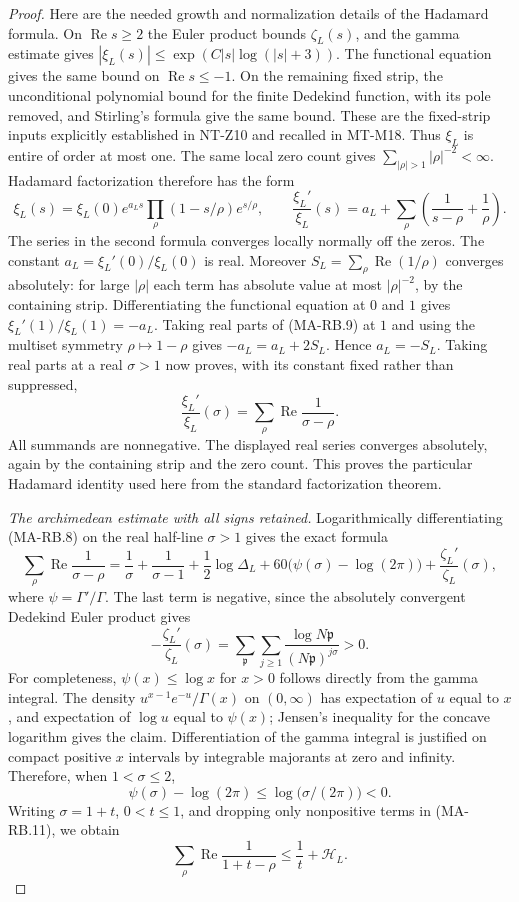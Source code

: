 \begin{proof}
Here are the needed growth and normalization details of the
Hadamard formula.  On $\operatorname{Re}s\ge2$ the Euler product
bounds $\zeta_L(s)$, and the gamma estimate gives
$|\xi_L(s)|\le\exp(C|s|\log(|s|+3))$.
The functional equation gives the same bound on
$\operatorname{Re}s\le-1$.
On the remaining fixed strip, the unconditional polynomial
bound for the finite Dedekind function, with its pole removed,
and Stirling's formula give the same bound.
These are the fixed-strip inputs explicitly established in
NT-Z10 and recalled in MT-M18.
Thus $\xi_L$ is entire of order at most one.
The same local zero count gives
$\sum_{|\rho|>1}|\rho|^{-2}<\infty$.
Hadamard factorization therefore has the form
\[
 \xi_L(s)=\xi_L(0)e^{a_Ls}
        \prod_\rho(1-s/\rho)e^{s/\rho},
 \qquad
 \frac{\xi_L'}{\xi_L}(s)
   =a_L+\sum_\rho\left(\frac1{s-\rho}+\frac1\rho\right).
 \tag{MA-RB.9}
\]
The series in the second formula converges locally normally
off the zeros.  The constant
$a_L=\xi_L'(0)/\xi_L(0)$ is real.
Moreover
$S_L=\sum_\rho\operatorname{Re}(1/\rho)$ converges absolutely:
for large $|\rho|$ each term has absolute value at most
$|\rho|^{-2}$, by the containing strip.
Differentiating the functional equation at $0$ and $1$ gives
$\xi_L'(1)/\xi_L(1)=-a_L$.
Taking real parts of (MA-RB.9) at $1$ and using the
multiset symmetry $\rho\mapsto1-\rho$ gives
$-a_L=a_L+2S_L$.
Hence $a_L=-S_L$.  Taking real parts at a real $\sigma>1$
now proves, with its constant fixed rather than suppressed,
\[
 \frac{\xi_L'}{\xi_L}(\sigma)
             =\sum_\rho\operatorname{Re}\frac1{\sigma-\rho}.
 \tag{MA-RB.10}
\]
All summands are nonnegative.  The displayed real series
converges absolutely, again by the containing strip and the
zero count.  This proves the particular Hadamard identity
used here from the standard factorization theorem.

\emph{The archimedean estimate with all signs retained.}
Logarithmically differentiating (MA-RB.8) on the real
half-line $\sigma>1$ gives the exact formula
\[
 \sum_\rho\operatorname{Re}\frac1{\sigma-\rho}
 =\frac1{\sigma}+\frac1{\sigma-1}
       +\frac12\log\Delta_L
       +60\bigl(\psi(\sigma)-\log(2\pi)\bigr)
       +\frac{\zeta_L'}{\zeta_L}(\sigma),
 \tag{MA-RB.11}
\]
where $\psi=\Gamma'/\Gamma$.
The last term is negative, since the absolutely convergent
Dedekind Euler product gives
\[
 -\frac{\zeta_L'}{\zeta_L}(\sigma)
    =\sum_{\mathfrak p}\sum_{j\ge1}
          \frac{\log N\mathfrak p}{(N\mathfrak p)^{j\sigma}}>0.
 \tag{MA-RB.12}
\]
For completeness, $\psi(x)\le\log x$ for $x>0$ follows
directly from the gamma integral.  The density
$u^{x-1}e^{-u}/\Gamma(x)$ on $(0,\infty)$ has expectation
of $u$ equal to $x$, and expectation of $\log u$ equal
to $\psi(x)$; Jensen's inequality for the concave logarithm
gives the claim.  Differentiation of the gamma integral is
justified on compact positive $x$ intervals by integrable
majorants at zero and infinity.
Therefore, when $1<\sigma\le2$,
\[
                \psi(\sigma)-\log(2\pi)
                    \le\log\bigl(\sigma/(2\pi)\bigr)<0.
\]
Writing $\sigma=1+t$, $0<t\le1$, and dropping only
nonpositive terms in (MA-RB.11), we obtain
\[
        \sum_\rho\operatorname{Re}\frac1{1+t-\rho}
                     \le \frac1t+\mathcal H_L.
 \tag{MA-RB.13}
\]


\end{proof}
